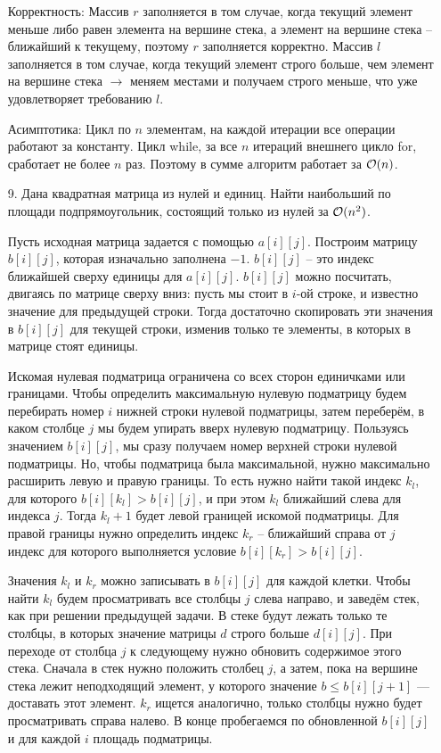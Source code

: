 \begin{enumerate}
\begin{solution}
        Корректность:
        Массив $r$ заполняется в том случае, когда текущий элемент меньше либо равен элемента на вершине стека, а элемент на вершине стека -- ближайший к текущему, поэтому $r$ заполняется корректно. Массив $l$ заполняется в том случае, когда текущий элемент строго больше, чем элемент на вершине стека $\rightarrow$ меняем местами и получаем строго меньше, что уже удовлетворяет требованию $l$.

        Асимптотика:
        Цикл по $n$ элементам, на каждой итерации все операции работают за константу. Цикл while, за все $n$ итераций внешнего цикло for, сработает не более $n$ раз. Поэтому в сумме алгоритм работает за $\mathcal{O}(n)$.

    \end{solution}

    \item[9.] %
        Дана квадратная матрица из нулей и единиц. Найти наибольший по площади
        подпрямоугольник, состоящий только из нулей за $\mathcal{O}(n^2)$.
    
    \begin{solution}
        Пусть исходная матрица задается с помощью $a[i][j]$. Построим матрицу $b[i][j]$, которая изначально заполнена $-1$. $b[i][j]$ -- это индекс ближайшей сверху единицы для $a[i][j]$. $b[i][j]$ можно посчитать, двигаясь по матрице сверху вниз: пусть мы стоит в $i$-ой строке, и известно значение для предыдущей строки. Тогда достаточно скопировать эти значения в $b[i][j]$ для текущей строки, изменив только те элементы, в которых в матрице стоят единицы.

        Искомая нулевая подматрица ограничена со всех сторон единичками или границами. Чтобы определить максимальную нулевую подматрицу будем перебирать номер $i$ нижней строки нулевой подматрицы, затем переберём, в каком столбце $j$ мы будем упирать вверх нулевую подматрицу. Пользуясь значением $b[i][j]$, мы сразу получаем номер верхней строки нулевой подматрицы. Но, чтобы подматрица была максимальной, нужно максимально расширить левую и правую границы. То есть нужно найти такой индекс $k_l$, для которого $b[i][k_l] > b[i][j]$, и при этом $k_l$ ближайший слева для индекса $j$. Тогда $k_l+1$ будет левой границей искомой подматрицы. Для правой границы нужно определить индекс $k_r$ -- ближайший справа от $j$ индекс для которого выполняется условие $b[i][k_r] > b[i][j]$.
        
        Значения $k_l$ и $k_r$ можно записывать в $b[i][j]$ для каждой клетки. Чтобы найти $k_l$ будем просматривать все столбцы $j$ слева направо, и заведём стек, как при решении предыдущей задачи. В стеке будут лежать только те столбцы, в которых значение матрицы $d$ строго больше $d[i][j]$. При переходе от столбца $j$ к следующему нужно обновить содержимое этого стека. Сначала в стек нужно положить столбец $j$, а затем, пока на вершине стека лежит неподходящий элемент, у которого значение $b \le b[i][j+1]$ — доставать этот элемент. $k_r$ ищется аналогично, только столбцы нужно будет просматривать справа налево. В конце пробегаемся по обновленной $b[i][j]$ и для каждой $i$ площадь подматрицы.
        

\end{solution}
\end{enumerate}
